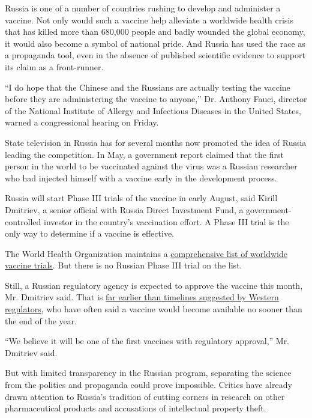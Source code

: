 Russia is one of a number of countries rushing to develop and administer
a vaccine. Not only would such a vaccine help alleviate a worldwide
health crisis that has killed more than 680,000 people and badly wounded
the global economy, it would also become a symbol of national pride. And
Russia has used the race as a propaganda tool, even in the absence of
published scientific evidence to support its claim as a front-runner.

``I do hope that the Chinese and the Russians are actually testing the
vaccine before they are administering the vaccine to anyone,'' Dr.
Anthony Fauci, director of the National Institute of Allergy and
Infectious Diseases in the United States, warned a congressional hearing
on Friday.

State television in Russia has for several months now promoted the idea
of Russia leading the competition. In May, a government report claimed
that the first person in the world to be vaccinated against the virus
was a Russian researcher who had injected himself with a vaccine early
in the development process.

Russia will start Phase III trials of the vaccine in early August, said
Kirill Dmitriev, a senior official with Russia Direct Investment Fund, a
government-controlled investor in the country's vaccination effort. A
Phase III trial is the only way to determine if a vaccine is effective.

The World Health Organization maintains a
\href{https://www.who.int/publications/m/item/draft-landscape-of-covid-19-candidate-vaccines}{comprehensive
list of worldwide vaccine trials}. But there is no Russian Phase III
trial on the list.

Still, a Russian regulatory agency is expected to approve the vaccine
this month, Mr. Dmitriev said. That is
\href{https://www.nytimes3xbfgragh.onion/interactive/2020/science/coronavirus-vaccine-tracker.html}{far
earlier than timelines suggested by Western regulators}, who have often
said a vaccine would become available no sooner than the end of the
year.

``We believe it will be one of the first vaccines with regulatory
approval,'' Mr. Dmitriev said.

But with limited transparency in the Russian program, separating the
science from the politics and propaganda could prove impossible. Critics
have already drawn attention to Russia's tradition of cutting corners in
research on other pharmaceutical products and accusations of
intellectual property theft.

